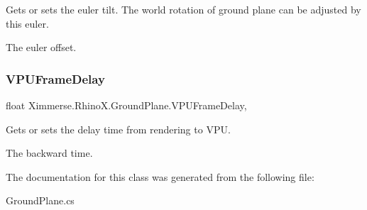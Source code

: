 Gets or sets the euler tilt. The world rotation of ground plane can be adjusted by this euler. 

The euler offset.\mbox{\label{class_ximmerse_1_1_rhino_x_1_1_ground_plane_ad865efbe2157148db7f6ee7513b461b8}} 
\subsubsection{\texorpdfstring{V\+P\+U\+Frame\+Delay}{VPUFrameDelay}}
{\footnotesize\ttfamily float Ximmerse.\+Rhino\+X.\+Ground\+Plane.\+V\+P\+U\+Frame\+Delay\hspace{0.3cm}{\ttfamily [get]}, {\ttfamily [set]}}



Gets or sets the delay time from rendering to V\+PU. 

The backward time.

The documentation for this class was generated from the following file\+:\begin{DoxyCompactItemize}
\item 
Ground\+Plane.\+cs\end{DoxyCompactItemize}
